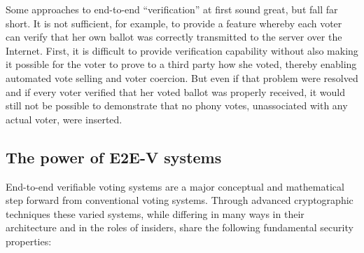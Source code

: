 Some approaches to end-to-end ``verification'' at first sound great,
but fall far short. It is not sufficient, for example, to provide a
feature whereby each voter can verify that her own ballot was
correctly transmitted to the server over the Internet. First, it is
difficult to provide verification capability without also making it
possible for the voter to prove to a third party how she voted,
thereby enabling automated vote selling and voter coercion. But even
if that problem were resolved and if every voter verified that her
voted ballot was properly received, it would still not be possible to
demonstrate that no phony votes, unassociated with any actual voter,
were inserted.

\subsection{The power of E2E-V systems}

End-to-end verifiable voting systems are a major conceptual and
mathematical step forward from conventional voting systems. Through
advanced cryptographic techniques these varied systems, while
differing in many ways in their architecture and in the roles of
insiders, share the following fundamental security properties:

